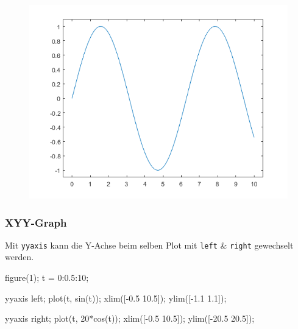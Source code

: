\documentclass[
  10pt,
  a4paper,
]{article}
\newenvironment{Shaded}{}{}
\newcommand{\FloatTok}[1]{\textcolor[rgb]{0.00,0.36,0.77}{#1}}
\newcommand{\NormalTok}[1]{\textcolor[rgb]{0.14,0.16,0.18}{#1}}
\newcommand{\OperatorTok}[1]{\textcolor[rgb]{0.14,0.16,0.18}{#1}}
\newcommand{\VariableTok}[1]{\textcolor[rgb]{0.89,0.38,0.04}{#1}}
\numberwithin{equation}{section}
\begin{document}
\begin{multicols}{2}
\begin{figure}[H]
{\centering \includegraphics{images/plot_simple.png}

}

\end{figure}

\hypertarget{xyy-graph}{%
\subsubsection{XYY-Graph}\label{xyy-graph}}

Mit \texttt{yyaxis} kann die Y-Achse beim selben Plot mit \texttt{left}
\& \texttt{right} gewechselt werden.

\begin{Shaded}
\begin{Highlighting}[]
\VariableTok{figure}\NormalTok{(}\FloatTok{1}\NormalTok{)}\OperatorTok{;}
\VariableTok{t} \OperatorTok{=} \FloatTok{0}\OperatorTok{:}\FloatTok{0.5}\OperatorTok{:}\FloatTok{10}\OperatorTok{;}

\VariableTok{yyaxis} \VariableTok{left}\OperatorTok{;}
\VariableTok{plot}\NormalTok{(}\VariableTok{t}\OperatorTok{,} \VariableTok{sin}\NormalTok{(}\VariableTok{t}\NormalTok{))}\OperatorTok{;}
\VariableTok{xlim}\NormalTok{([}\OperatorTok{{-}}\FloatTok{0.5} \FloatTok{10.5}\NormalTok{])}\OperatorTok{;}
\VariableTok{ylim}\NormalTok{([}\OperatorTok{{-}}\FloatTok{1.1} \FloatTok{1.1}\NormalTok{])}\OperatorTok{;}

\VariableTok{yyaxis} \VariableTok{right}\OperatorTok{;}
\VariableTok{plot}\NormalTok{(}\VariableTok{t}\OperatorTok{,} \FloatTok{20}\OperatorTok{*}\VariableTok{cos}\NormalTok{(}\VariableTok{t}\NormalTok{))}\OperatorTok{;}
\VariableTok{xlim}\NormalTok{([}\OperatorTok{{-}}\FloatTok{0.5} \FloatTok{10.5}\NormalTok{])}\OperatorTok{;}
\VariableTok{ylim}\NormalTok{([}\OperatorTok{{-}}\FloatTok{20.5} \FloatTok{20.5}\NormalTok{])}\OperatorTok{;}
\end{Highlighting}
\end{Shaded}


\end{multicols}
\end{document}
